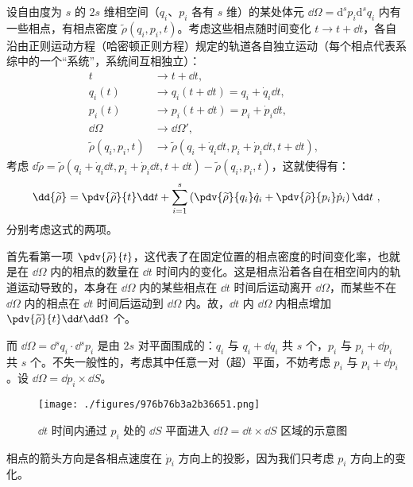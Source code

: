 设自由度为 $s$ 的 $2s$ 维相空间（$q_i$、$p_i$ 各有 $s$ 维）的某处体元 $\dd \Omega = \mathrm{d}^{s}{p_i}  \mathrm{d}^{s}{q_i}$ 内有一些相点，有相点密度 $\widetilde \rho(q_i, p_i, t)$。考虑这些相点随时间变化 $t \rightarrow t + \dd t$，各自沿由正则运动方程（哈密顿正则方程）规定的轨道各自独立运动（每个相点代表系综中的一个“系统”，系统间互相独立）：
$$
\begin{aligned}
t                            &\rightarrow t+\dd t, \\
q_i(t)                       &\rightarrow q_i(t+\dd t) = q_i + \dot q_i \dd t, \\
p_i(t)                       &\rightarrow p_i(t+\dd t) = p_i + \dot p_i \dd t, \\
\dd \Omega                   &\rightarrow \dd \Omega', \\
\widetilde \rho(q_i, p_i, t) &\rightarrow \widetilde \rho(q_i + \dot q_i \dd t, p_i + \dot p_i \dd t, t + \dd t),
\end{aligned}~~
$$
考虑 $\dd{\widetilde{\rho}} = \widetilde{\rho}(q_i + \dot q_i \dd t, p_i + \dot p_i \dd t, t + \dd t) - \widetilde{\rho}(q_i, p_i, t)$，这就使得有：
\begin{equation}\label{eq_LiouTh_3}
\dd{\widetilde \rho} = \pdv{\widetilde \rho}{t} \dd t + \sum_{i=1}^{s}\left(\pdv{\widetilde \rho}{q_i}\dot q_i + \pdv{\widetilde \rho}{p_i}\dot p_i\right) \dd t  ~,
\end{equation}
分别考虑这式的两项。

首先看第一项 $\pdv{\widetilde \rho}{t}$，这代表了在固定位置的相点密度的时间变化率，也就是在 $\dd \Omega$ 内的相点的数量在 $\dd t$ 时间内的变化。这是相点沿着各自在相空间内的轨道运动导致的，本身在 $\dd \Omega$ 内的某些相点在 $\dd t$ 时间后运动离开 $\dd \Omega$，而某些不在 $\dd \Omega$ 内的相点在 $\dd t$ 时间后运动到 $\dd \Omega$ 内。故，$\dd t$ 内 $\dd \Omega$ 内相点增加 $\pdv{\widetilde \rho}{t} \dd t \dd \Omega$ 个。

而 $\dd \Omega = \dd{}^s q_i \cdot \dd{}^s p_i$ 是由 $2s$ 对平面围成的：$q_i$ 与 $q_i + \dd q_i$ 共 $s$ 个，$p_i$ 与 $p_i + \dd p_i$ 共 $s$ 个。不失一般性的，考虑其中任意一对（超）平面，不妨考虑 $p_i$ 与 $p_i+\dd p_i$ 。设 $\dd \Omega = \dd p_i \times \dd S$。
\begin{figure}[ht]
\centering
\texttt{[image: ./figures/976b76b3a2b36651.png]}
\caption{$\dd t$ 时间内通过 $p_i$ 处的 $\dd S$ 平面进入 $\dd \Omega = \dd t \times \dd S$ 区域的示意图} \label{fig_LiouTh_3}
\end{figure}
相点的箭头方向是各相点速度在 $\dot p_i$ 方向上的投影，因为我们只考虑 $p_i$ 方向上的变化。

